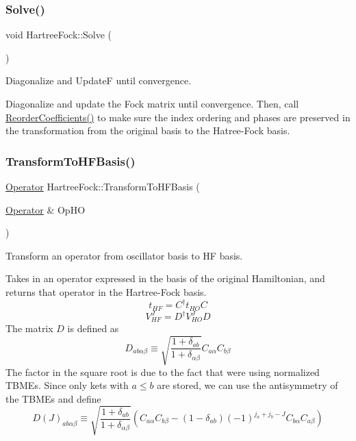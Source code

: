 \subsubsection{\texorpdfstring{Solve()}{Solve()}}
{\footnotesize\ttfamily void Hartree\+Fock\+::\+Solve (\begin{DoxyParamCaption}{ }\end{DoxyParamCaption})}



Diagonalize and UpdateF until convergence. 

Diagonalize and update the Fock matrix until convergence. Then, call \hyperlink{classHartreeFock_a2eb6754f57250a03a2e1bd3e2aef4daf}{Reorder\+Coefficients()} to make sure the index ordering and phases are preserved in the transformation from the original basis to the Hatree-\/\+Fock basis. \mbox{\label{classHartreeFock_a55914915cea16669e549025c244b62d0}} 
\subsubsection{\texorpdfstring{Transform\+To\+H\+F\+Basis()}{TransformToHFBasis()}}
{\footnotesize\ttfamily \hyperlink{classOperator}{Operator} Hartree\+Fock\+::\+Transform\+To\+H\+F\+Basis (\begin{DoxyParamCaption}\item[{\hyperlink{classOperator}{Operator} \&}]{Op\+HO }\end{DoxyParamCaption})}



Transform an operator from oscillator basis to HF basis. 

Takes in an operator expressed in the basis of the original Hamiltonian, and returns that operator in the Hartree-\/\+Fock basis. \[ t_{HF} = C^{\dagger} t_{HO} C \] \[ V_{HF}^{J} = D^{\dagger} V^{J}_{HO} D \] The matrix $ D $ is defined as \[ D_{ab\alpha\beta} \equiv \sqrt{ \frac{1+\delta_{ab}} {1+\delta_{\alpha\beta}} } C_{a\alpha} C_{b\beta} \] The factor in the square root is due to the fact that we\textquotesingle{}re using normalized T\+B\+ME\textquotesingle{}s. Since only kets with $ a\leq b$ are stored, we can use the antisymmetry of the T\+B\+ME\textquotesingle{}s and define \[ D(J)_{ab\alpha\beta} \equiv \sqrt{ \frac{1+\delta_{ab}} {1+\delta_{\alpha\beta}} } \left( C_{a\alpha} C_{b\beta} -(1-\delta_{ab})(-1)^{j_a+j_b-J} C_{b\alpha}C_{a\beta}\right) \] \mbox{\label{classHartreeFock_aad38c905e7e9f9e9757b5800e6910c61}} 
